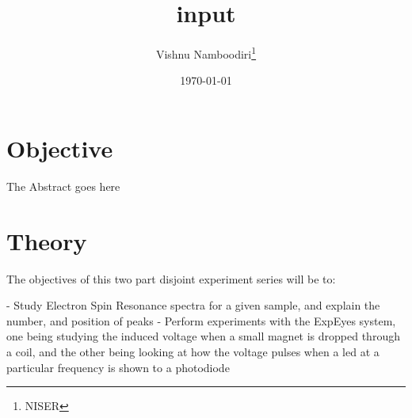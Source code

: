 \documentclass{double}
\begin{document}
\title{input}

\author{Vishnu Namboodiri\thanks{NISER}}

\date{\today}
\maketitle

\section{Objective}
The Abstract goes here

\section{Theory}
The objectives of this two part disjoint experiment series will be to:

- Study Electron Spin Resonance spectra for a given sample, and explain the number, and position of peaks
- Perform experiments with the ExpEyes system, one being studying the induced voltage when a small magnet is dropped through a coil, and the other being looking at how the voltage pulses when a led at a particular frequency is shown to a photodiode
\end{document}
